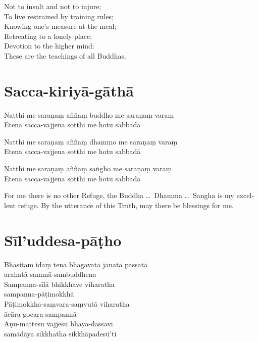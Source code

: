 Not to insult and not to injure;\\
To live restrained by training rules;\\
Knowing one's measure at the meal;\\
Retreating to a lonely place;\\
Devotion to the higher mind:\\
These are the teachings of all Buddhas.

\section{Sacca-kiriyā-gāthā}

\begin{leader}
\end{leader}


Natthi me saraṇaṃ aññaṃ buddho me saraṇaṃ varaṃ\\
Etena sacca-vajjena sotthi me hotu sabbadā

Natthi me saraṇaṃ aññaṃ dhammo me saraṇaṃ varaṃ\\
Etena sacca-vajjena sotthi me hotu sabbadā

Natthi me saraṇaṃ aññaṃ saṅgho me saraṇaṃ varaṃ\\
Etena sacca-vajjena sotthi me hotu sabbadā


\begin{english}
  For me there is no other Refuge, the Buddha \ldots\ Dhamma \ldots\ Sangha is
  my excellent refuge. By the utterance of this Truth, may there be blessings
  for me.
\end{english}

\section{Sīl'uddesa-pāṭho}

\begin{leader}
\end{leader}


Bhāsitam idaṃ tena bhagavatā jānatā passatā\\
arahatā sammā-sambuddhena\\
Sampanna-sīlā bhikkhave viharatha\\
sampanna-pāṭimokkhā\\
Pāṭimokkha-saṃvara-saṃvutā viharatha\\
ācāra-gocara-sampannā\\
Aṇu-mattesu vajjesu bhaya-dassāvī\\
samādāya sikkhatha sikkhāpadesū'ti

